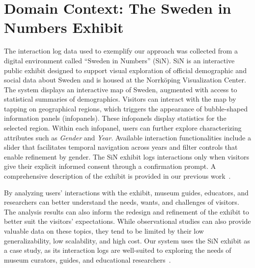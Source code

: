 \documentclass[preprint,journal]{vgtc}            %
\begin{document}
\section{Domain Context: The Sweden in Numbers Exhibit}
\label{sec:SiN}

The interaction log data used to exemplify our approach was collected from a digital environment called ``Sweden in Numbers'' (SiN).
SiN is an interactive public exhibit designed to support visual exploration of official demographic and social data about Sweden and is housed at the Norrk\"{o}ping Visualization Center.
The system displays an interactive map of Sweden, augmented with access to statistical summaries of demographics.
Visitors can interact with the map by tapping on geographical regions, which triggers the appearance of bubble-shaped information panels (infopanels).
These infopanels display statistics for the selected region. 
Within each infopanel, users can further explore characterizing attributes such as \textit{Gender} and \textit{Year}.
Available interaction functionalities include a slider that facilitates temporal navigation across years and filter controls that enable refinement by gender.
The SiN exhibit logs interactions only when visitors give their explicit informed consent through a confirmation prompt. 
A comprehensive description of the exhibit is provided in our previous work~\cite{Yu25Revealing}. 

By analyzing users' interactions with the exhibit, museum guides, educators, and researchers 
can better understand the needs, wants, and challenges of visitors. 
The analysis results can also inform the redesign and refinement of the exhibit to better suit the visitors' expectations.
While observational studies can also provide valuable data on these topics, they tend to be limited by their low generalizability, low scalability, and high cost.
Our system uses the SiN exhibit as a case study, as its interaction logs are well-suited to exploring the needs of museum curators, guides, and educational researchers~\cite{Yu25Revealing}.
\end{document}
